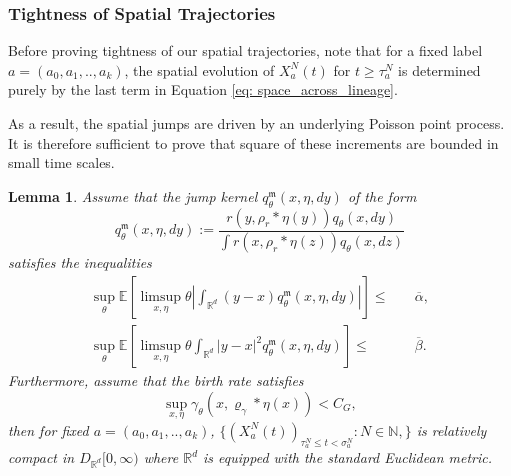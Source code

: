 \documentclass[12pt]{article}
\newtheorem{lemma}[theorem]{Lemma}
\newcommand{\IR}{\mathbb R}
\newcommand{\kernel}{\rho}  %
\newcommand{\smooth}[1]{\kernel_{#1} \! * \!}  %
\begin{document}
\subsubsection{Tightness of Spatial Trajectories}
Before proving tightness of our spatial trajectories, 
note that for a fixed label
$a=(a_0,a_1,..,a_k)$,
the spatial evolution of 
$X^N_{a}(t)$ for $t \geq \tau^N_{a}$
is determined
purely by the last term 
in Equation \eqref{eq: space_across_lineage}.

As a result, the spatial jumps are 
driven by 
an underlying Poisson point process. 
It is therefore sufficient
to prove that square of 
these increments are bounded
in small time scales.

\begin{lemma} \label{lem: tightness of individual spatial trajectory}
Assume that the jump kernel $q_\theta^\mathfrak{m}(x, \eta, dy)$ of the form
$$
    q_\theta^\mathfrak{m}(x,\eta,  dy)
    :=
    \frac{
        r(y, \smooth{r} \eta(y)) q_\theta(x, dy)
    }{
        \int r(x, \smooth{r} \eta(z)) q_\theta(x, dz)
    } 
$$
satisfies the inequalities
\begin{align}
   \sup_{\theta}\mathbb{E}\left[\limsup_{x, \eta} \theta \left| \int_{\IR^d} (y-x) q^{\mathfrak{m}}_{ \theta}(x,\eta,dy) \right|\right] \leq & \quad \overline{\alpha},\\
   \sup_{\theta}\mathbb{E}\left[\limsup_{x, \eta} \theta \int_{\IR^d} |y-x|^2 q^{\mathfrak{m}}_{ \theta}(x,\eta,dy)\right]  \leq & \quad \overline{\beta}.
\end{align}
Furthermore, assume that the birth rate satisfies 
$$\sup_{x, \eta}\gamma_{\theta}(x, \varrho_{\gamma}*\eta(x)) < C_G,$$ 
then for fixed $a=(a_0,a_1,..,a_k)$,
$\{(X^{N}_{a}(t))_{\tau^{N}_a\leq t < \sigma^{N}_{a}}: N \in \mathbb{N},  \}$ is relatively compact in 
$D_{\IR^d}[0,\infty )$ where $\IR^d$ is equipped with the standard Euclidean metric. 
\end{lemma}
\end{document}
